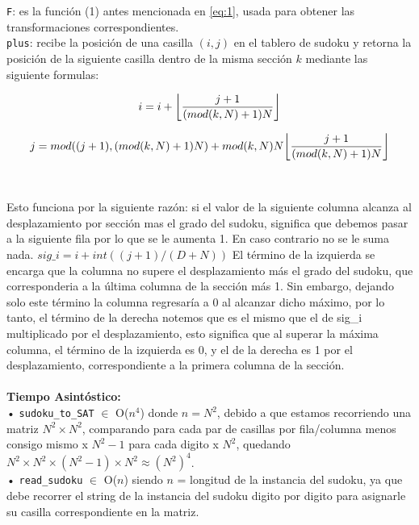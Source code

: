 \documentclass[letterpaper,12pt]{article}
\DeclarePairedDelimiter\floor{\lfloor}{\rfloor}
\begin{document}
\texttt{F}: es la función (1) antes mencionada en \ref{eq:1}, usada para obtener las transformaciones correspondientes.\\

\texttt{plus}: recibe la posición de una casilla $(i,j)$ en el tablero de sudoku y retorna la posición de la siguiente casilla dentro de la misma sección $k$ mediante las siguiente formulas:

\begin{equation*}
   i = i + \floor*{\frac{j+1}{(mod(k,N)+1)N}}
\end{equation*}

\begin{equation*}
   j = mod((j+1),(mod(k,N)+1)N) + mod(k,N)N \floor*{\frac{j+1}{(mod(k,N)+1)N}}
\end{equation*}\\
\\

Esto funciona por la siguiente razón: si el valor de la siguiente columna alcanza al desplazamiento por sección mas el grado del sudoku, significa que debemos pasar a la siguiente fila por lo que se le aumenta 1. En caso contrario no se le suma nada. $sig\_i = i+int((j+1)/(D+N))$ El término de la izquierda se encarga que la columna no supere el desplazamiento más el grado del sudoku, que corresponderia a la última columna de la sección más 1. Sin embargo, dejando solo este término la columna regresaría a 0 al alcanzar dicho máximo, por lo tanto, el término de la derecha notemos que es el mismo que el de sig\_i multiplicado por el desplazamiento, esto significa que al superar la máxima columna, el término de la izquierda es 0, y el de la derecha es 1 por el desplazamiento, correspondiente a la primera columna de la sección.\\
\\
\textbf{Tiempo Asintóstico:}\\

• \texttt{sudoku\_to\_SAT} $\in$ O($n^4$) donde $n = N^2$, debido a que estamos recorriendo una matriz $N^2 \times N^2$, comparando para cada par de casillas por fila/columna menos consigo mismo x $N^2-1$ para cada digito x $N^2$, quedando $N^2 \times N^2 \times (N^2-1) \times N^2 \approx (N^2)^4$.\\

• \texttt{read\_sudoku} $\in$ O($n$) siendo $n$ = longitud de la instancia del sudoku, ya que debe recorrer el string de la instancia del sudoku digito por digito para asignarle su casilla correspondiente en la matriz.\\
\end{document}
